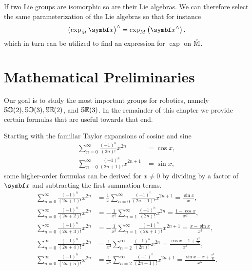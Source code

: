 If two Lie groups are isomorphic so are their Lie algebras. We can therefore select the same parameterization of the Lie algebras so that for instance
\begin{equation}
  \left(\exp_{\check M} \x \right)^\wedge = \exp_{M} \left( \x^\wedge \right),
\end{equation}
which in turn can be utilized to find an expression for $\exp$ on $\check {{\mathbb{M}}}$.

\section{Mathematical Preliminaries}

Our goal is to study the most important groups for robotics, namely ${\mathbb{SO}(2)}, {\mathbb{SO}(3)}, {\mathbb{SE}(2)}$, and ${\mathbb{SE}(3)}$. In the remainder of this chapter we provide certain formulas that are useful towards that end.

Starting with the familiar Taylor expansions of cosine and sine
\begin{align}
  \label{eq:cos_sum} \sum_{n=0}^\infty \frac{(-1)^n}{(2n)!} x^{2n}     & = \cos x, \\
  \label{eq:sin_sum} \sum_{n=0}^\infty \frac{(-1)^n}{(2n+1)!} x^{2n+1} & = \sin x,
\end{align}
some higher-order formulas can be derived for $x \neq 0$ by dividing by a factor of $\x$ and subtracting the first summation terms.
\begin{align}
  \label{eq:trig_sum1}
  \sum_{n=0}^\infty \frac{(-1)^n}{(2n+1)!} x^{2n} & = \frac{1}{x} \sum_{n=0}^\infty  \frac{(-1)^n}{(2n+1)!} x^{2n+1} = \frac{\sin x}{x},                        \\
  \label{eq:trig_sum2}
  \sum_{n=0}^\infty \frac{(-1)^n}{(2n+2)!} x^{2n} & = -\frac{1}{x^2} \sum_{n=1}^\infty \frac{(-1)^n}{(2n)!} x^{2n} = \frac{1 - \cos x}{x^2},                    \\
  \label{eq:trig_sum3}
  \sum_{n=0}^\infty \frac{(-1)^n}{(2n+3)!} x^{2n} & = -\frac{1}{x^3} \sum_{n=1}^\infty \frac{(-1)^n}{(2n+1)!} x^{2n+1} = \frac{x - \sin x}{x^3},                \\
  \label{eq:trig_sum4}
  \sum_{n=0}^\infty \frac{(-1)^n}{(2n+4)!} x^{2n} & = \frac{1}{x^4} \sum_{n=2}^\infty \frac{(-1)^n}{(2n)!} x^{2n} = \frac{\cos x - 1 + \frac{x^2}{2}}{x^4},     \\
  \label{eq:trig_sum5}
  \sum_{n=0}^\infty \frac{(-1)^n}{(2n+5)!} x^{2n} & = \frac{1}{x^5} \sum_{n=2}^\infty \frac{(-1)^n}{(2n+1)!} x^{2n+1} = \frac{\sin x - x + \frac{x^3}{6}}{x^5}.
\end{align}

